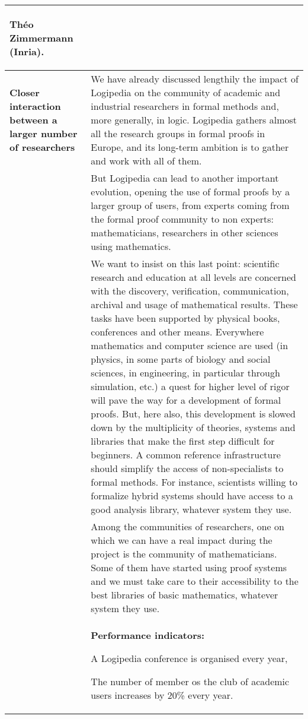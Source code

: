 \begin{longtable}{|p{}|p{}|}
\begin{shaded}
Théo Zimmermann (Inria).
\end{shaded}
\\
\hline
{\bf Closer interaction between a larger number of researchers}
&
We have already discussed lengthily the impact of Logipedia on the
community of academic and industrial researchers in formal methods
and, more generally, in logic. Logipedia gathers almost all the
research groups in formal proofs in Europe, and its long-term ambition
is to gather and work with all of them.
\\
&
\hspace{0.4cm}
But Logipedia can lead to another important evolution, opening the use
of formal proofs by a larger group of users, from experts coming
from the formal proof community to non experts: 
mathematicians, researchers in other sciences using mathematics. 
\\
&
\hspace{0.4cm}
We want to insist on this last point: scientific research and
education at all levels are concerned with the discovery,
verification, communication, archival and usage of mathematical
results.  These tasks have been supported by physical books,
conferences and other means.  Everywhere mathematics and computer
science are used (in physics, in some parts of biology and social
sciences, in engineering, in particular through simulation, etc.) a
quest for higher level of rigor will pave the way for a development
of formal proofs. But, here also, this development is slowed down by the
multiplicity of theories, systems and libraries that make the first
step difficult for beginners. A common reference infrastructure should
simplify the access of non-specialists to formal methods.  For
instance, scientists willing to formalize hybrid systems should have
access to a good analysis library, whatever system they use.
\\
& 
\hspace{0.4cm} Among the communities of researchers, one on which we
can have a real impact during the project is the community of 
mathematicians.  Some of them have started using proof systems and we
must take care to their accessibility to the best libraries of
basic mathematics, whatever system
they use.\\
&
\colorbox{color2}{\bf Performance indicators:}
\begin{compactitem}
\item A Logipedia conference is organised every year, 
\item The number of member os the club of academic users increases by 20\% every year.

\end{compactitem}
\end{longtable}
